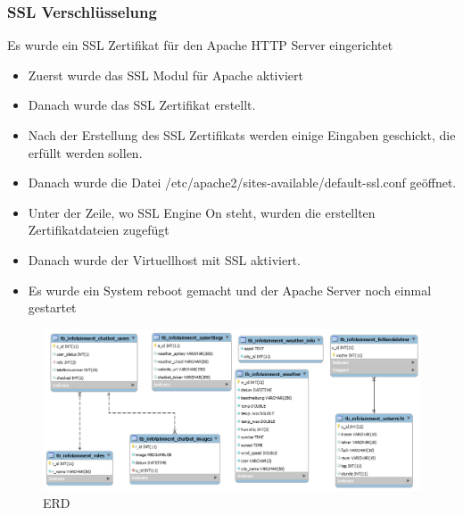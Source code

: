 \subsubsection{SSL Verschlüsselung}
Es wurde ein SSL Zertifikat für den Apache HTTP Server eingerichtet 
\begin{itemize}
	\item Zuerst wurde das SSL Modul für Apache aktiviert
\end{itemize}
\begin{itemize}
	\item Danach wurde das SSL Zertifikat erstellt. 
\end{itemize}
\begin{itemize}
	\item Nach der Erstellung des SSL Zertifikats werden einige Eingaben geschickt, die erfüllt werden sollen. 
\end{itemize}
\begin{itemize}
	\item Danach wurde die Datei /etc/apache2/sites-available/default-ssl.conf geöffnet.
\end{itemize}
\begin{itemize}
	\item Unter der Zeile, wo SSL Engine On steht, wurden die erstellten Zertifikatdateien zugefügt
\end{itemize}
\begin{itemize}
	\item Danach wurde der Virtuellhost mit SSL aktiviert. 
\end{itemize}
\begin{itemize}
	\item Es wurde ein System reboot gemacht und der Apache Server noch einmal gestartet \cite{50_SSS}
\end{itemize}
\begin{figure}[ht]	
	\includegraphics[width=\linewidth]{./figures/erd_irena.png}
	\caption{ERD}
	\label{fig:erd}
\end{figure}
